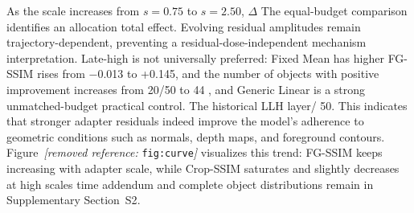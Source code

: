 \documentclass[times,twocolumn,final]{elsarticle}
\providecommand{\DIFadd}[1]{{\protect\color{blue} \sf #1}} %
\providecommand{\DIFdel}[1]{{\protect\color{red} \scriptsize #1}} %
\providecommand{\DIFaddbegin}{} %
\providecommand{\DIFaddend}{} %
\providecommand{\DIFdelbegin}{} %
\providecommand{\DIFdelend}{} %
\begin{document}

\DIFdel{As the scale increases from $s = 0.75$ to $s = 2.50$, $\Delta$}\DIFdelend \DIFaddbegin \DIFadd{The equal-budget comparison identifies an allocation total effect. Evolving residual amplitudes remain trajectory-dependent, preventing a residual-dose-independent mechanism interpretation. Late-high is not universally preferred: Fixed Mean has higher }\DIFaddend FG-SSIM\DIFdelbegin \DIFdel{rises from $-$0.013 to +0.145, and the number of objects with positive improvement increases from 20/50 to 44}\DIFdelend \DIFaddbegin \DIFadd{, and Generic Linear is a strong unmatched-budget practical control. The historical LLH layer}\DIFaddend /\DIFdelbegin \DIFdel{50. This indicates that stronger adapter residuals indeed improve the model's adherence to geometric conditions such as normals, depth maps, and foreground contours. Figure~\textit{[removed reference: }\texttt{fig:curve}\textit{]} visualizes this trend: FG-SSIM keeps increasing with adapter scale, while Crop-SSIM saturates and slightly decreases at high scales}\DIFdelend \DIFaddbegin \DIFadd{time addendum and complete object distributions remain in Supplementary Section~S2}\DIFaddend .
\end{document}
